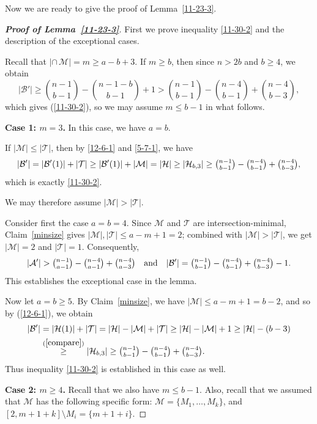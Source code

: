\documentclass[11pt]{article}
\newcommand{\m}{\mathcal}
\begin{document}
Now we are ready to give the proof of Lemma~\ref{11-23-3}.
\begin{proof}[{\bf Proof of Lemma~\ref{11-23-3}}]  

First we prove inequality \eqref{11-30-2} and the description of the exceptional cases.


Recall that $|\cap \, \m M|=m\ge a-b+3$. 
If $m\ge b$, then since $n>2b$ and $b\ge 4$, we obtain
\[
|\mathcal{B}'|\ge {n-1\choose b-1}-{n-1-b\choose b-1}+1>{n-1\choose b-1}-{n-4\choose b-1}+{n-4\choose b-3},
\]
which gives (\ref{11-30-2}),
so we may assume $m \le b-1$ in what follows.

{\bf Case 1: $m=3$.} In this case, we have $a=b$. 

If $|\mathcal{M}|\le |\mathcal{T}|$, then by \eqref{12-6-1} and \eqref{5-7-1}, we have
\[
|\mathcal{B}'| = |\mathcal{B}'(1)| + |\mathcal{T}| 
               \ge |\mathcal{B}'(1)| + |\mathcal{M}|
               = |\mathcal{H}|
               \ge |\mathcal{H}_{b,3}|
               \ge \tbinom{n-1}{b-1} - \tbinom{n-4}{b-1} + \tbinom{n-4}{b-3},
\]
which is exactly \eqref{11-30-2}. 

We may therefore assume $|\mathcal{M}| > |\mathcal{T}|$.

Consider first the case $a=b=4$. Since $\m M$ and $\m T$ are intersection-minimal,
Claim~\ref{minsize} gives $|\m M|, |\m T|\le a-m+1=2$; combined with $|\mathcal{M}|> |\mathcal{T}|$, we get $|\mathcal{M}|=2$ and $|\mathcal{T}|=1$. 
Consequently, 
\[
|\mathcal{A}'| > \tbinom{n-1}{a-1} - \tbinom{n-4}{a-1} + \tbinom{n-4}{a-3}
\quad\text{and}\quad
|\mathcal{B}'| = \tbinom{n-1}{b-1} - \tbinom{n-4}{b-1} + \tbinom{n-4}{b-3} - 1.
\]
This establishes the exceptional case in the lemma.


Now let $a=b\ge 5$. By Claim~\ref{minsize}, we have $|\m M|\le a-m+1=b-2$, and so by (\ref{12-6-1}), we obtain
\begin{align*}
|\mathcal{B}'| 
   &= |\mathcal{H}(1)| + |\mathcal{T}|
     = |\mathcal{H}| - |\mathcal{M}| + |\mathcal{T}|\ge |\mathcal{H}| - |\mathcal{M}| + 1
     \ge |\mathcal{H}| - (b-3) \\
   &\overset{(\ref{compare})}{\ge} |\mathcal{H}_{b,3}|\ge \tbinom{n-1}{b-1} - \tbinom{n-4}{b-1} + \tbinom{n-4}{b-3}.
\end{align*}
Thus inequality \eqref{11-30-2} is established in this case as well.

{\bf Case 2: $m\ge 4$.}
Recall that we also have $m \le b-1$. Also, recall that we assumed that $\m M$ has the following specific form: 
$\mathcal{M}=\{M_1, \dots, M_{k}\}$, and $[2,m+1+k]\setminus M_i =\{m+1+i\}$.


\end{proof}
\end{document}
